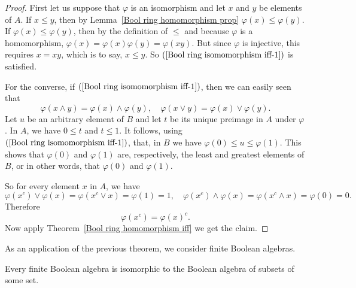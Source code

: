 \begin{proof}
First let us suppose that $\varphi$ is an isomorphism and let $x$ and $y$ be elements of 
$A$. If $x\leq y$, then by Lemma~\ref{Bool ring homomorphism prop} $\varphi(x)\leq\varphi(y)$. If $\varphi(x)\leq\varphi(y)$, then 
by the definition of $\leq$ and because $\varphi$ is a homomorphism, $\varphi(x)=\varphi(x)\varphi(y)=\varphi(xy)$.
But since $\varphi$ is injective, this requires $x=xy$, which is to say, $x\leq y$. So $(\ref{Bool ring isomomorphism iff-1})$ is
satisfied.\par
For the converse, if $(\ref{Bool ring isomomorphism iff-1})$, then we can easily seen that
\[\varphi(x\wedge y)=\varphi(x)\wedge\varphi(y),\quad \varphi(x\vee y)=\varphi(x)\vee\varphi(y).\]
Let $u$ be an arbitrary element of $B$ and let $t$ be its unique preimage in $A$ under $\varphi$. In $A$, we have $0\leq t$ and $t\leq 1$. It 
follows, using $(\ref{Bool ring isomomorphism iff-1})$, that, in $B$ we have $\varphi(0)\leq u\leq\varphi(1)$. This shows that $\varphi(0)$ and 
$\varphi(1)$ are, respectively, the least and greatest elements of $B$, or in other words, that $\varphi(0)$ and $\varphi(1)$.\par
So for every element $x$ in $A$, we have
\[\varphi(x^c)\vee\varphi(x)=\varphi(x^c\vee x)=\varphi(1)=1,\quad \varphi(x^c)\wedge\varphi(x)=\varphi(x^c\wedge x)=\varphi(0)=0.\]
Therefore
\[\varphi(x^c)=\varphi(x)^c.\]
Now apply Theorem~\ref{Bool ring homomorphism iff} we get the claim.
\end{proof}
As an application of the previous theorem, we consider finite Boolean algebras.
\begin{theorem}\label{Bool ring finite}
Every finite Boolean algebra is isomorphic to the Boolean algebra of subsets of some set.
\end{theorem}
